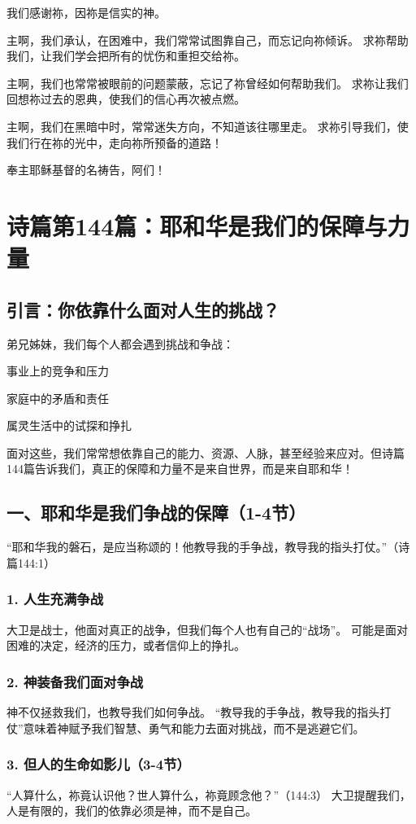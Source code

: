 \documentclass[a4paper, 12pt]{article}
\begin{document}
我们感谢祢，因祢是信实的神。

主啊，我们承认，在困难中，我们常常试图靠自己，而忘记向祢倾诉。
求祢帮助我们，让我们学会把所有的忧伤和重担交给祢。

主啊，我们也常常被眼前的问题蒙蔽，忘记了祢曾经如何帮助我们。
求祢让我们回想祢过去的恩典，使我们的信心再次被点燃。

主啊，我们在黑暗中时，常常迷失方向，不知道该往哪里走。
求祢引导我们，使我们行在祢的光中，走向祢所预备的道路！

奉主耶稣基督的名祷告，阿们！
\newpage
\section{诗篇第144篇：耶和华是我们的保障与力量}
\subsection*{引言：你依靠什么面对人生的挑战？}
弟兄姊妹，我们每个人都会遇到挑战和争战：

事业上的竞争和压力

家庭中的矛盾和责任

属灵生活中的试探和挣扎

面对这些，我们常常想依靠自己的能力、资源、人脉，甚至经验来应对。但诗篇144篇告诉我们，真正的保障和力量不是来自世界，而是来自耶和华！

\subsection*{一、耶和华是我们争战的保障（1-4节）}
“耶和华我的磐石，是应当称颂的！他教导我的手争战，教导我的指头打仗。”（诗篇144:1）

\subsubsection*{1. 人生充满争战}
大卫是战士，他面对真正的战争，但我们每个人也有自己的“战场”。
可能是面对困难的决定，经济的压力，或者信仰上的挣扎。
\subsubsection*{2. 神装备我们面对争战}
神不仅拯救我们，也教导我们如何争战。
“教导我的手争战，教导我的指头打仗”意味着神赋予我们智慧、勇气和能力去面对挑战，而不是逃避它们。
\subsubsection*{3. 但人的生命如影儿（3-4节）}
“人算什么，祢竟认识他？世人算什么，祢竟顾念他？”（144:3）
大卫提醒我们，人是有限的，我们的依靠必须是神，而不是自己。
\end{document}
